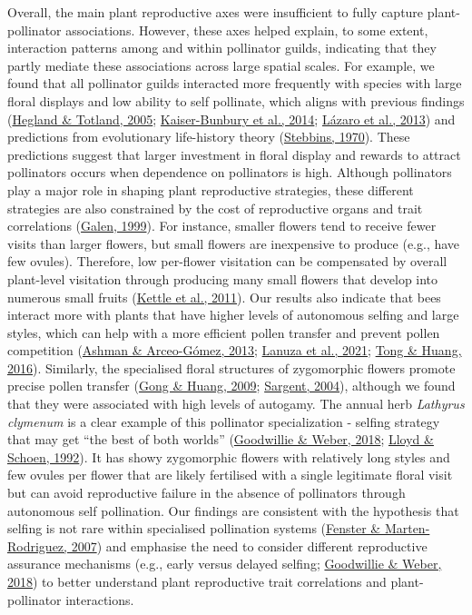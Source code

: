 \documentclass[
  12pt,
  a4paper,
]{article}
\begin{document}
Overall, the main plant reproductive axes were insufficient to fully capture plant-pollinator associations. However, these axes helped explain, to some extent, interaction patterns among and within pollinator guilds, indicating that they partly mediate these associations across large spatial scales. For example, we found that all pollinator guilds interacted more frequently with species with large floral displays and low ability to self pollinate, which aligns with previous findings (\protect\hyperlink{ref-hegland2005}{Hegland \& Totland, 2005}; \protect\hyperlink{ref-kaiser2014}{Kaiser-Bunbury et al., 2014}; \protect\hyperlink{ref-lazaro2013}{Lázaro et al., 2013}) and predictions from evolutionary life-history theory (\protect\hyperlink{ref-stebbins1970}{Stebbins, 1970}). These predictions suggest that larger investment in floral display and rewards to attract pollinators occurs when dependence on pollinators is high. Although pollinators play a major role in shaping plant reproductive strategies, these different strategies are also constrained by the cost of reproductive organs and trait correlations (\protect\hyperlink{ref-galen1999}{Galen, 1999}). For instance, smaller flowers tend to receive fewer visits than larger flowers, but small flowers are inexpensive to produce (e.g., have few ovules). Therefore, low per-flower visitation can be compensated by overall plant-level visitation through producing many small flowers that develop into numerous small fruits (\protect\hyperlink{ref-kettle2011}{Kettle et al., 2011}). Our results also indicate that bees interact more with plants that have higher levels of autonomous selfing and large styles, which can help with a more efficient pollen transfer and prevent pollen competition (\protect\hyperlink{ref-ashman2013}{Ashman \& Arceo-Gómez, 2013}; \protect\hyperlink{ref-lanuza2021}{Lanuza et al., 2021}; \protect\hyperlink{ref-tong2016}{Tong \& Huang, 2016}). Similarly, the specialised floral structures of zygomorphic flowers promote precise pollen transfer (\protect\hyperlink{ref-gong2009}{Gong \& Huang, 2009}; \protect\hyperlink{ref-sargent2004}{Sargent, 2004}), although we found that they were associated with high levels of autogamy. The annual herb \emph{Lathyrus clymenum} is a clear example of this pollinator specialization - selfing strategy that may get ``the best of both worlds'' (\protect\hyperlink{ref-goodwillie2018}{Goodwillie \& Weber, 2018}; \protect\hyperlink{ref-lloyd1992}{Lloyd \& Schoen, 1992}). It has showy zygomorphic flowers with relatively long styles and few ovules per flower that are likely fertilised with a single legitimate floral visit but can avoid reproductive failure in the absence of pollinators through autonomous self pollination. Our findings are consistent with the hypothesis that selfing is not rare within specialised pollination systems (\protect\hyperlink{ref-fenster2007}{Fenster \& Marten-Rodriguez, 2007}) and emphasise the need to consider different reproductive assurance mechanisms (e.g., early versus delayed selfing; \protect\hyperlink{ref-goodwillie2018}{Goodwillie \& Weber, 2018}) to better understand plant reproductive trait correlations and plant-pollinator interactions.
\end{document}
